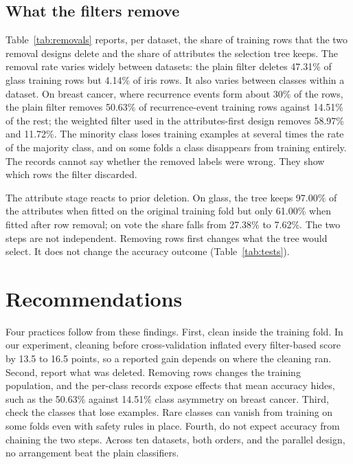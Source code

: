 \documentclass[conference]{IEEEtran}
\begin{document}
\subsection{What the filters remove}
\label{sec:deletion}
Table~\ref{tab:removals} reports, per dataset, the share of training rows that
the two removal designs delete and the share of attributes the selection tree
keeps. The removal rate varies widely between datasets: the plain filter
deletes 47.31\% of glass training rows but 4.14\% of iris rows. It also varies
between classes within a dataset. On breast cancer, where recurrence events
form about 30\% of the rows, the plain filter removes 50.63\% of
recurrence-event training rows against 14.51\% of the rest; the weighted filter
used in the attributes-first design removes 58.97\% and 11.72\%. The minority
class loses training examples at several times the rate of the majority class,
and on some folds a class disappears from training entirely. The records
cannot say whether the removed labels were wrong. They show which rows the
filter discarded.

The attribute stage reacts to prior deletion. On glass, the tree keeps 97.00\%
of the attributes when fitted on the original training fold but only 61.00\%
when fitted after row removal; on vote the share falls from 27.38\% to 7.62\%.
The two steps are not independent. Removing rows first changes what the tree
would select. It does not change the accuracy outcome (Table~\ref{tab:tests}).

\begin{table}[t]
\caption{Rows deleted and attributes kept (\%), averaged over 100 folds}
\label{tab:removals}
\centering
\footnotesize
\setlength{\tabcolsep}{2pt}

\end{table}

\section{Recommendations}
Four practices follow from these findings.
First, clean inside the training fold. In our experiment, cleaning before
cross-validation inflated every filter-based score by 13.5 to 16.5 points, so
a reported gain depends on where the cleaning ran.
Second, report what was deleted. Removing rows changes the training
population, and the per-class records expose effects that mean accuracy hides,
such as the 50.63\% against 14.51\% class asymmetry on breast cancer.
Third, check the classes that lose examples. Rare classes can vanish from
training on some folds even with safety rules in place.
Fourth, do not expect accuracy from chaining the two steps. Across ten
datasets, both orders, and the parallel design, no arrangement beat the plain
classifiers.
\end{document}
